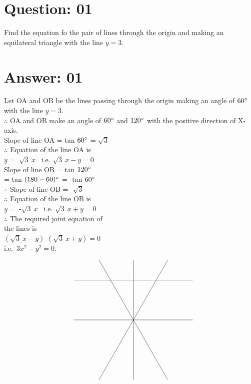 \documentclass[17pt]{extarticle}
\begin{document}
\noindent
\begin{fleqn} 


\section{Question: 01}
Find the equation fo the pair of lines through the origin and making an equilateral triangle with the line $y = 3.$


\section{Answer: 01}
Let OA and OB be the lines passing through the origin making an angle of $ 60\degree$ with the line $y = 3.$ \\
$\therefore$ OA and OB make an angle of $60\degree$ and $ 120\degree$ with the positive direction of X-axis.\\ 
Slope of line OA = tan $60\degree$ = $\sqrt{3}$ \\
$\therefore$ Equation of the line OA is\\  
$y=$ $\sqrt{3}\ x$ \ i.e. $\sqrt{3}\ x - y = 0 $ \\ 
Slope of line OB = tan $120\degree$ \\
= tan $(180 - 60)\degree$ = -tan $60\degree$\\
$\therefore$ Slope of line OB = -$\sqrt{3}$ \\
$\therefore$ Equation of the line OB is\\  
$y=$ -$\sqrt{3}\ x$ \ i.e. $\sqrt{3}\ x + y = 0 $ \\
$\therefore$ The required joint equation of\\ the lines is\\
$\left( \sqrt{3}\ x - y\right)$ $\left( \sqrt{3}\ x + y\right) = 0 $\\
i.e.\ $ 3x^2 - y^2 = 0.$

\begin{equation} \nonumber
\quad
\begin{alignedat}{4}
\begin{tikzpicture}
\draw (-3,0) -- (3,0);
\draw (0,-3) -- (0,3);
\draw (-3,2) -- (3,2);
\draw (-1.73,-3) -- (1.73,3);
\draw (-1.73,3) -- (1.73,-3);


\end{tikzpicture}
\end{alignedat}
\end{equation}
\end{fleqn}
\end{document}
